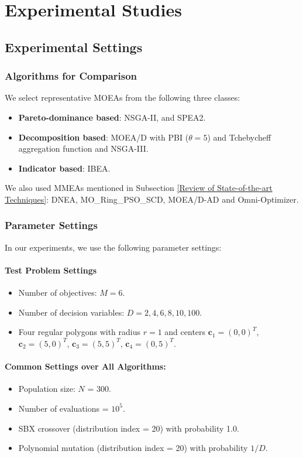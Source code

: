 \documentclass[conference]{IEEEtran}
\begin{document}
\section{Experimental Studies}
\label{Experimental Studies}
\subsection{Experimental Settings}
\label{Experimental Settings}
\subsubsection{Algorithms for Comparison}
We select representative MOEAs from the following three classes:
\begin{itemize}
    \item \textbf{Pareto-dominance based}: NSGA-II\cite{deb2002fast}, and SPEA2\cite{zitzler2001spea2}.
    \item \textbf{Decomposition based}: MOEA/D \cite{zhang2007moea} with PBI ($\theta=5$) and Tchebycheff aggregation function and NSGA-III\cite{deb2013evolutionary}.
    \item \textbf{Indicator based}: IBEA\cite{zitzler2004indicator}.
\end{itemize}

We also used MMEAs mentioned in Subsection \ref{Review of State-of-the-art Techniques}: DNEA\cite{liu2018double}, MO\_Ring\_PSO\_SCD\cite{yue2017multiobjective}, MOEA/D-AD\cite{tanabe2018decomposition} and Omni-Optimizer\cite{deb2005omni}.
\subsubsection{Parameter Settings}
In our experiments, we use the following parameter settings: 
\paragraph{Test Problem Settings}
\begin{itemize}
     \item Number of objectives: $M=6$.
    \item Number of decision variables: $D=2, 4, 6, 8, 10, 100$.
    \item Four regular polygons with radius $r=1$ and centers $\boldsymbol{c}_1=(0, 0)^T$, $\boldsymbol{c}_2=(5, 0)^T$, $\boldsymbol{c}_3=(5, 5)^T$, $\boldsymbol{c}_4=(0, 5)^T$. 
\end{itemize}
\paragraph{Common Settings over All Algorithms:}
\begin{itemize}
    \item Population size: $N$ = 300.
    \item Number of evaluations = $10^5$.
    \item SBX crossover (distribution index = 20) with probability 1.0.
    \item Polynomial mutation (distribution index = 20) with probability $1/D$.
\end{itemize}
\end{document}
